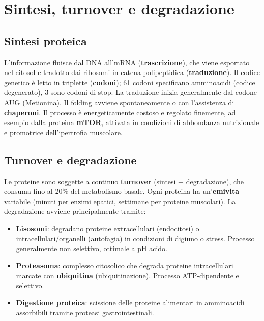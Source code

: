 \documentclass[12pt,a4paper]{report}
\begin{document}
\section{Sintesi, turnover e degradazione}
\subsection{Sintesi proteica}
L'informazione fluisce dal DNA all'mRNA (\textbf{trascrizione}), che viene esportato nel citosol e tradotto dai ribosomi in catena polipeptidica (\textbf{traduzione}). Il codice genetico è letto in triplette (\textbf{codoni}); 61 codoni specificano amminoacidi (codice degenerato), 3 sono codoni di stop. La traduzione inizia generalmente dal codone AUG (Metionina). Il folding avviene spontaneamente o con l'assistenza di \textbf{chaperoni}. Il processo è energeticamente costoso e regolato finemente, ad esempio dalla proteina \textbf{mTOR}, attivata in condizioni di abbondanza nutrizionale e promotrice dell'ipertrofia muscolare.

\subsection{Turnover e degradazione}
Le proteine sono soggette a continuo \textbf{turnover} (sintesi + degradazione), che consuma fino al 20\% del metabolismo basale. Ogni proteina ha un'\textbf{emivita} variabile (minuti per enzimi epatici, settimane per proteine muscolari). La degradazione avviene principalmente tramite:
\begin{itemize}
\item \textbf{Lisosomi}: degradano proteine extracellulari (endocitosi) o intracellulari/organelli (autofagia) in condizioni di digiuno o stress. Processo generalmente non selettivo, ottimale a pH acido.
\item \textbf{Proteasoma}: complesso citosolico che degrada proteine intracellulari marcate con \textbf{ubiquitina} (ubiquitinazione). Processo ATP-dipendente e selettivo.
\item \textbf{Digestione proteica}: scissione delle proteine alimentari in amminoacidi assorbibili tramite proteasi gastrointestinali.
\end{itemize}
\end{document}
